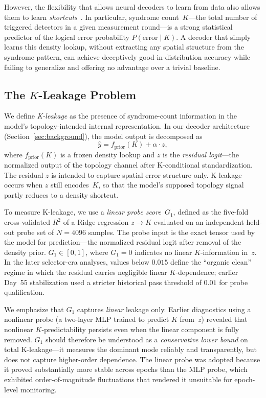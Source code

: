 However, the flexibility that allows neural decoders to learn from data also allows them to learn \emph{shortcuts}~\cite{PLACEHOLDER_shortcut_learning}. In particular, syndrome count~$K$---the total number of triggered detectors in a given measurement round---is a strong statistical predictor of the logical error probability $P(\text{error} \mid K)$. A decoder that simply learns this density lookup, without extracting any spatial structure from the syndrome pattern, can achieve deceptively good in-distribution accuracy while failing to generalize and offering no advantage over a trivial baseline.

\subsection{The $K$-Leakage Problem}
\label{sec:kleakage}

We define \emph{K-leakage} as the presence of syndrome-count information in the model's topology-intended internal representation. In our decoder architecture (Section~\ref{sec:background}), the model output is decomposed as
\begin{equation}
\hat{y} = f_{\text{prior}}(K) + \alpha \cdot z,
\end{equation}
where $f_{\text{prior}}(K)$ is a frozen density lookup and $z$ is the \emph{residual logit}---the normalized output of the topology channel after K-conditional standardization. The residual $z$ is intended to capture spatial error structure only. K-leakage occurs when $z$ still encodes~$K$, so that the model's supposed topology signal partly reduces to a density shortcut.

To measure K-leakage, we use a \emph{linear probe score}~$G_1$, defined as the five-fold cross-validated $R^2$ of a Ridge regression $z \to K$ evaluated on an independent held-out probe set of $N{=}4096$ samples. The probe input is the exact tensor used by the model for prediction---the normalized residual logit after removal of the density prior. $G_1 \in [0, 1]$, where $G_1{=}0$ indicates no linear $K$-information in~$z$. In the later selector-era analyses, values below $0.015$ define the ``organic clean'' regime in which the residual carries negligible linear $K$-dependence; earlier Day~55 stabilization used a stricter historical pass threshold of $0.01$ for probe qualification.

We emphasize that $G_1$ captures \emph{linear} leakage only. Earlier diagnostics using a nonlinear probe (a two-layer MLP trained to predict $K$ from~$z$) revealed that nonlinear $K$-predictability persists even when the linear component is fully removed. $G_1$ should therefore be understood as a \emph{conservative lower bound} on total K-leakage---it measures the dominant mode reliably and transparently, but does not capture higher-order dependence. The linear probe was adopted because it proved substantially more stable across epochs than the MLP probe, which exhibited order-of-magnitude fluctuations that rendered it unsuitable for epoch-level monitoring.


